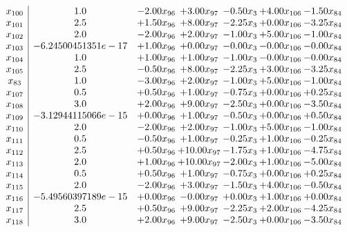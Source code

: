 \documentclass[8pt]{article}
\begin{document}
\[\begin{array}{c| c c@{\hskip 2pt} c@{\hskip 2pt} c@{\hskip 2pt} c@{\hskip 2pt} c@{\hskip 2pt} }
 x_{100}   &  1.0 & -2.00 x_{96} & +  3.00 x_{97} & -0.50 x_{3} & +  4.00 x_{106} & -1.50 x_{84}\\
 x_{101}   &  2.5 & +  1.50 x_{96} & +  8.00 x_{97} & -2.25 x_{3} & +  0.00 x_{106} & -3.25 x_{84}\\
 x_{102}   &  2.0 & -2.00 x_{96} & +  2.00 x_{97} & -1.00 x_{3} & +  5.00 x_{106} & -1.00 x_{84}\\
 x_{103}   &  -6.24500451351e-17 & +  1.00 x_{96} & +  0.00 x_{97} & -0.00 x_{3} & -0.00 x_{106} & -0.00 x_{84}\\
 x_{104}   &  1.0 & +  1.00 x_{96} & +  1.00 x_{97} & -1.00 x_{3} & -0.00 x_{106} & -0.00 x_{84}\\
 x_{105}   &  2.5 & -0.50 x_{96} & +  8.00 x_{97} & -2.25 x_{3} & +  3.00 x_{106} & -3.25 x_{84}\\
 x_{83}   &  1.0 & -3.00 x_{96} & +  2.00 x_{97} & -1.00 x_{3} & +  5.00 x_{106} & -1.00 x_{84}\\
 x_{107}   &  0.5 & +  0.50 x_{96} & +  1.00 x_{97} & -0.75 x_{3} & +  0.00 x_{106} & +  0.25 x_{84}\\
 x_{108}   &  3.0 & +  2.00 x_{96} & +  9.00 x_{97} & -2.50 x_{3} & +  0.00 x_{106} & -3.50 x_{84}\\
 x_{109}   &  -3.12944115066e-15 & +  0.00 x_{96} & +  1.00 x_{97} & -0.50 x_{3} & +  0.00 x_{106} & +  0.50 x_{84}\\
 x_{110}   &  2.0 & -2.00 x_{96} & +  2.00 x_{97} & -1.00 x_{3} & +  5.00 x_{106} & -1.00 x_{84}\\
 x_{111}   &  0.5 & -0.50 x_{96} & +  1.00 x_{97} & -0.25 x_{3} & +  1.00 x_{106} & -0.25 x_{84}\\
 x_{112}   &  2.5 & +  0.50 x_{96} & + 10.00 x_{97} & -1.75 x_{3} & +  1.00 x_{106} & -4.75 x_{84}\\
 x_{113}   &  2.0 & +  1.00 x_{96} & + 10.00 x_{97} & -2.00 x_{3} & +  1.00 x_{106} & -5.00 x_{84}\\
 x_{114}   &  0.5 & +  0.50 x_{96} & +  1.00 x_{97} & -0.75 x_{3} & +  0.00 x_{106} & +  0.25 x_{84}\\
 x_{115}   &  2.0 & -2.00 x_{96} & +  3.00 x_{97} & -1.50 x_{3} & +  4.00 x_{106} & -0.50 x_{84}\\
 x_{116}   &  -5.49560397189e-15 & +  0.00 x_{96} & -0.00 x_{97} & +  0.00 x_{3} & +  1.00 x_{106} & +  0.00 x_{84}\\
 x_{117}   &  2.5 & +  0.50 x_{96} & +  9.00 x_{97} & -2.25 x_{3} & +  2.00 x_{106} & -4.25 x_{84}\\
 x_{118}   &  3.0 & +  2.00 x_{96} & +  9.00 x_{97} & -2.50 x_{3} & +  0.00 x_{106} & -3.50 x_{84}\\

\end{array}\]
\end{document}
